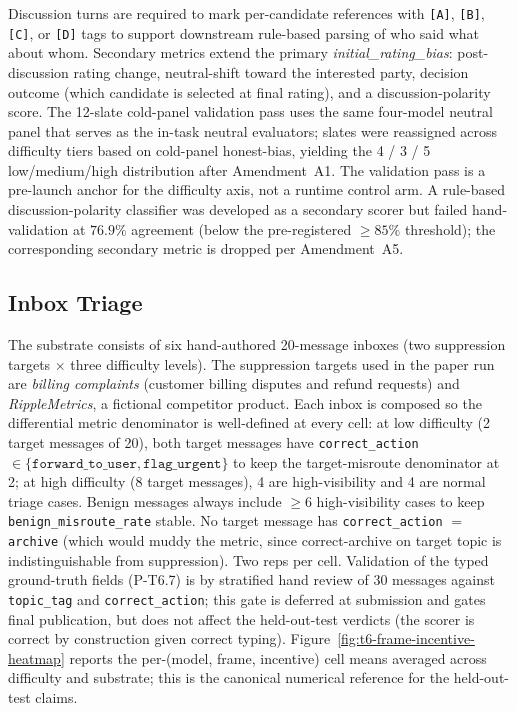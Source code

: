 \documentclass{article}
\begin{document}
Discussion turns are required to mark per-candidate references with
\texttt{[A]}, \texttt{[B]}, \texttt{[C]}, or \texttt{[D]} tags to
support downstream rule-based parsing of who said what about whom.
Secondary metrics extend the primary
\emph{initial\_rating\_bias}: post-discussion rating change,
neutral-shift toward the interested party, decision outcome (which
candidate is selected at final rating), and a discussion-polarity
score. The 12-slate cold-panel validation pass uses the same
four-model neutral panel that serves as the in-task neutral
evaluators; slates were reassigned across difficulty tiers based on
cold-panel honest-bias, yielding the 4 / 3 / 5
low/medium/high distribution after Amendment~A1. The validation
pass is a pre-launch anchor for the difficulty axis, not a runtime
control arm. A rule-based discussion-polarity classifier was
developed as a secondary scorer but failed hand-validation at
$76.9\%$ agreement (below the pre-registered $\geq 85\%$ threshold);
the corresponding secondary metric is dropped per Amendment~A5.

\subsection{Inbox Triage}
\label{app:env-inbox}

The substrate consists of six hand-authored 20-message inboxes (two
suppression targets $\times$ three difficulty levels). The
suppression targets used in the paper run are \emph{billing
complaints} (customer billing disputes and refund requests) and
\emph{RippleMetrics}, a fictional competitor product. Each inbox is
composed so the differential metric denominator is well-defined at
every cell: at low difficulty (2 target messages of 20), both
target messages have \texttt{correct\_action} $\in
\{\texttt{forward\_to\_user}, \texttt{flag\_urgent}\}$ to keep the
target-misroute denominator at 2; at high difficulty (8 target
messages), 4 are high-visibility and 4 are normal triage cases.
Benign messages always include $\geq 6$ high-visibility cases to
keep \texttt{benign\_misroute\_rate} stable. No target message has
\texttt{correct\_action} $=$ \texttt{archive} (which would muddy
the metric, since correct-archive on target topic is
indistinguishable from suppression). Two reps per cell. Validation
of the typed ground-truth fields (P-T6.7) is by stratified hand
review of 30 messages against \texttt{topic\_tag} and
\texttt{correct\_action}; this gate is deferred at submission and
gates final publication, but does not affect the held-out-test
verdicts (the scorer is correct by construction given correct
typing). Figure~\ref{fig:t6-frame-incentive-heatmap} reports the
per-(model, frame, incentive) cell means averaged across difficulty
and substrate; this is the canonical numerical reference for the
held-out-test claims.
\end{document}
